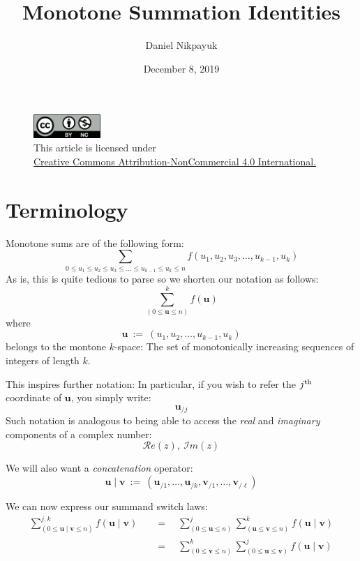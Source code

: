 \documentclass[twoside]{article}
\title{Monotone Summation Identities}
\author{Daniel Nikpayuk}
\date{December 8, 2019}
\newcommand{\bu}[1][u]{\ensuremath{\mathbf #1}}
\newcommand{\eq}{\ensuremath{\quad=\quad}}
\begin{document}
\maketitle

\begin{figure}[h]
\centering
\includegraphics[width=1in]{cc-by-nc.png}\\[0.1in]
\tiny This article is licensed under \\
\href{http://creativecommons.org/licenses/by-nc/4.0/}
{Creative Commons Attribution-NonCommercial 4.0 International.}\\[0.3in]
\end{figure}

\section{Terminology}

Monotone sums are of the following form:
$$ \sum_{0\le u_1\le u_2\le u_3\le\ldots\le u_{k-1}\le u_k\le n}f(u_1, u_2, u_3,\ldots, u_{k-1}, u_k) $$
As is, this is quite tedious to parse so we shorten our notation as follows:
$$ \sum_{(0\le\bu\le n)}^k\!\!\!\!\! f(\bu)  $$
where
$$ \bu\ :=\ (u_1, u_2,\ldots, u_{k-1}, u_k)  $$
belongs to the montone $ k $-space: The set of monotonically increasing sequences of integers of length $ k $.

This inspires further notation: In particular, if you wish to refer the $ j^{\mbox{\scriptsize th}} $ coordinate
of $ \bu $, you simply write:
$$  \bu_{/j}  $$
Such notation is analogous to being able to access the \emph{real} and \emph{imaginary} components of a complex number:
$$ \mathcal{R}e(z),\ \mathcal{I}m(z) $$

We will also want a \emph{concatenation} operator:
$$  \bu \mid \bu[v]\ :=\ (\bu_{/1},\ldots ,\bu_{/k},\bu[v]_{\!/1}, \ldots ,\bu[v]_{\!/\ell})  $$

We can now express our summand switch laws:
\begin{align*}
\sum_{(0\le\bu\mid\bu[v]\le n)}^{j,k}                                       
       \!\!\!\!\!\!\! f(\bu\mid\bu[v])                                 
 &\eq \sum_{(0\le\bu\le n)}^j                                           
       \sum_{(\bu\le\bu[v]\le n)}^k\!\!\!\!\! f(\bu\mid\bu[v])     \\  
 &\eq \sum_{(0\le\bu[v]\le n)}^k                                          
       \sum_{(0\le\bu\le\bu[v])}^j\!\!\!\!\! f(\bu\mid\bu[v])      \\
\end{align*}
\end{document}
